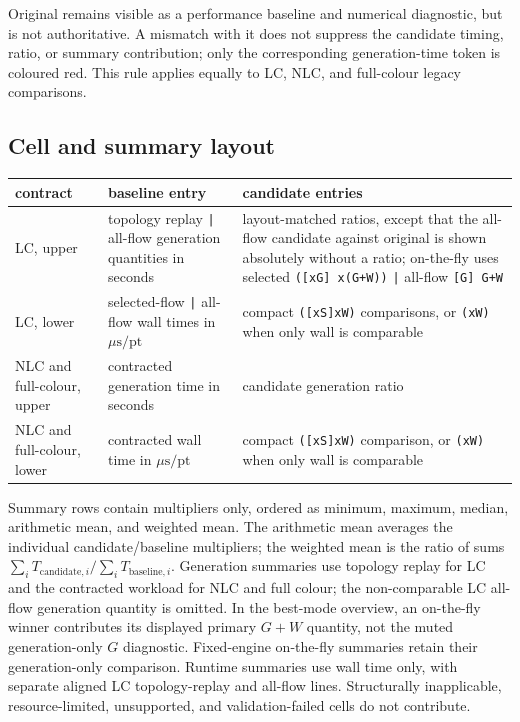Original \AC{} remains visible as a performance baseline and numerical
diagnostic, but is not authoritative. A mismatch with it does not suppress the
candidate timing, ratio, or summary contribution; only the corresponding
\AC{} generation-time token is coloured red. This rule applies equally to LC,
NLC, and full-colour legacy comparisons.

\subsection*{Cell and summary layout}

\begin{center}
\small
\begin{tabular}{@{}L{0.95in}L{2.45in}L{5.75in}@{}}
\toprule
\textbf{contract} & \textbf{baseline entry} & \textbf{candidate entries} \\
\midrule
LC, upper
  & topology replay \texttt{|} all-flow generation quantities in seconds
  & layout-matched ratios, except that the all-flow candidate against original
    \AC{} is shown absolutely without a ratio; on-the-fly uses selected
    \texttt{([xG] x(G+W))} \texttt{|} all-flow \texttt{[G] G+W} \\
LC, lower
  & selected-flow \texttt{|} all-flow wall times in
    \(\mu\mathrm{s}/\mathrm{pt}\)
  & compact \texttt{([xS]xW)} comparisons, or \texttt{(xW)} when only wall is
    comparable \\
NLC and full-colour, upper
  & contracted generation time in seconds
  & candidate generation ratio \\
NLC and full-colour, lower
  & contracted wall time in \(\mu\mathrm{s}/\mathrm{pt}\)
  & compact \texttt{([xS]xW)} comparison, or \texttt{(xW)} when only wall is
    comparable \\
\bottomrule
\end{tabular}
\end{center}

Summary rows contain multipliers only, ordered as minimum, maximum, median,
arithmetic mean, and weighted mean.  The arithmetic mean averages the
individual candidate/baseline multipliers; the weighted mean is the ratio of
sums
\(\sum_i T_{\mathrm{candidate},i}/\sum_i T_{\mathrm{baseline},i}\).
Generation summaries use topology replay for LC and the contracted workload
for NLC and full colour; the non-comparable LC all-flow generation quantity is
omitted. In the best-mode overview, an on-the-fly winner contributes its
displayed primary \(G+W\) quantity, not the muted generation-only \(G\)
diagnostic. Fixed-engine on-the-fly summaries retain their generation-only
comparison. Runtime summaries use wall time only, with
separate aligned LC topology-replay and all-flow lines. Structurally inapplicable,
resource-limited, unsupported, and validation-failed cells do not contribute.

